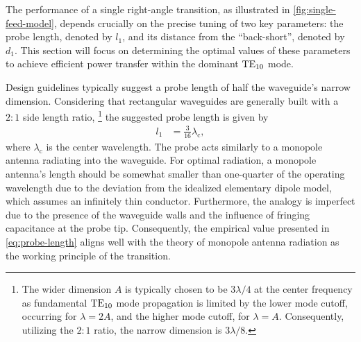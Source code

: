 \documentclass[14pt,a4paper]{ntust_report}
\begin{document}
The performance of a single right-angle transition, as illustrated in \cref{fig:single-feed-model}, depends crucially on the precise tuning of two key parameters: the probe length, denoted by $l_1$, and its distance from the \enquote{back-short}, denoted by $d_1$. This section will focus on determining the optimal values of these parameters to achieve efficient power transfer within the dominant $\text{TE}_{10}$ mode.

Design guidelines typically suggest a probe length of half the waveguide's narrow dimension. Considering that rectangular waveguides are generally built with a $2:1$ side length ratio,%
    \footnote{The wider dimension $A$ is typically chosen to be $3\lambda/4$ at the center frequency as fundamental $\text{TE}_{10}$ mode propagation is limited by the lower mode cutoff, occurring for $\lambda=2A$, and the higher mode cutoff, for $\lambda = A$. Consequently, utilizing the $2:1$ ratio, the narrow dimension is $3\lambda/8$.}
the suggested probe length is given by
\begin{align}
    \label{eq:probe-length}
    l_1 &= \frac{3}{16}\lambda_{\mathrm c},
\end{align}
where $\lambda_{\mathrm c}$ is the center wavelength. The probe acts similarly to a monopole antenna radiating into the waveguide. For optimal radiation, a monopole antenna's length should be somewhat smaller than one-quarter of the operating wavelength due to the deviation from the idealized elementary dipole model, which assumes an infinitely thin conductor. Furthermore, the analogy is imperfect due to the presence of the waveguide walls and the influence of fringing capacitance at the probe tip. Consequently, the empirical value presented in \cref{eq:probe-length} aligns well with the theory of monopole antenna radiation as the working principle of the transition.
\end{document}
